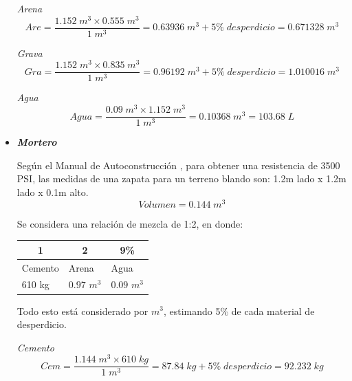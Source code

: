 \begin{itemize}
	\textit{Arena}
	\begin{equation}\label{eq:ec1}
		Are = \frac{{1.152\; m^{3}} \times {0.555\; m^{3}}}{1\;  m^{3}} = 0.63936\; m^{3} + 5\%\; desperdicio = 0.671328\;  m^{3}
	\end{equation}

	\textit{Grava}
	\begin{equation}\label{eq:ec1}
		Gra = \frac{{1.152\; m^{3}} \times {0.835\; m^{3}}}{1\;  m^{3}} = 0.96192\; m^{3} + 5\%\; desperdicio = 1.010016\;  m^{3} 
	\end{equation}

	\textit{Agua}
	\begin{equation}\label{eq:ec1}
		Agua = \frac{{0.09\; m^{3}} \times {1.152\; m^{3}}}{1\;  m^{3}} = 0.10368\; m^{3} = 103.68\; L
	\end{equation}
	
\item \textbf{\textit{Mortero}}

Según el Manual de Autoconstrucción \cite{CEMEX}, para obtener una resistencia de 3500 PSI, las medidas de una zapata para un terreno blando son: 1.2m lado x 1.2m lado x 0.1m alto.
\begin{equation}\label{eq:ec1}
	Volumen = 0.144\; m^{3}
\end{equation}

Se considera una relación de mezcla de 1:2, en donde: 

\begin{table}[H]
	\centering
	\begin{tabular}{|p{4.215em}|p{4.145em}|p{4.07em}|}
		\hline
		\multicolumn{1}{|c|}{\textbf{1}} & \multicolumn{1}{c|}{\textbf{2}} & \multicolumn{1}{c|}{\textbf{9\%}} \\
		\hline
		Cemento & Arena & Agua \\
		\hline
		610 kg & $ 0.97 $ $ m^3 $ & $ 0.09 $ $m^3 $ \\
		\hline
	\end{tabular}%
\end{table}
	Todo esto está considerado por $ m^{3} $, estimando 5\% de cada material de desperdicio.
	
	\textit{Cemento}\\
	\begin{equation}\label{eq:ec1}
		Cem = \frac{{1.144\; m^{3}} \times {610\; kg}}{1\;  m^{3}} = 87.84\; kg + 5\%\; desperdicio = 92.232 \; kg  
	\end{equation}


\end{itemize}
